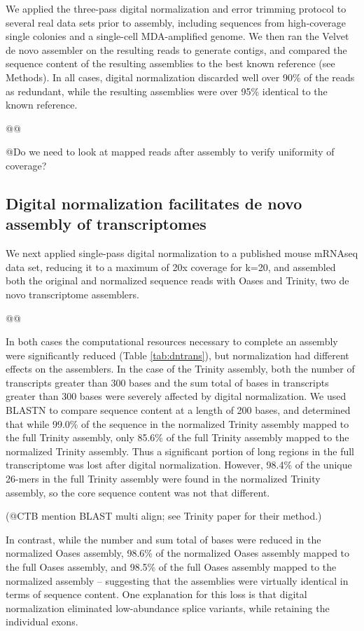 \documentclass[10pt]{article}
\begin{document}
We applied the three-pass digital normalization and error trimming
protocol to several real data sets prior to assembly, including
sequences from high-coverage single colonies and a single-cell
MDA-amplified genome.  We then ran the Velvet de novo assembler on the
resulting reads to generate contigs, and compared the sequence content
of the resulting assemblies to the best known reference (see Methods).
In all cases, digital normalization discarded well over 90\% of the
reads as redundant, while the resulting assemblies were over 95\%
identical to the known reference.

@@

@Do we need to look at mapped reads after assembly to verify uniformity
of coverage?

\subsection*{Digital normalization facilitates de novo assembly of transcriptomes}

We next applied single-pass digital normalization to a published mouse
mRNAseq data set, reducing it to a maximum of 20x coverage for k=20,
and assembled both the original and normalized sequence reads with
Oases and Trinity, two de novo transcriptome assemblers.

@@

In both cases the computational resources necessary to complete an
assembly were significantly reduced (Table \ref{tab:dntrans}), but
normalization had different effects on the assemblers.  In the case of
the Trinity assembly, both the number of transcripts greater than 300
bases and the sum total of bases in transcripts greater than 300 bases
were severely affected by digital normalization.  We used BLASTN to
compare sequence content at a length of 200 bases, and determined that
while 99.0\% of the sequence in the normalized Trinity assembly mapped
to the full Trinity assembly, only 85.6\% of the full Trinity assembly
mapped to the normalized Trinity assembly.  Thus a significant portion
of long regions in the full transcriptome was lost after digital
normalization.  However, 98.4\% of the unique 26-mers in the full
Trinity assembly were found in the normalized Trinity assembly, so the
core sequence content was not that different.

(@CTB mention BLAST multi align; see Trinity
paper for their method.)

In contrast, while the number and sum total of bases were reduced in
the normalized Oases assembly, 98.6\% of the normalized Oases
assembly mapped to the full Oases assembly, and 98.5\% of the full
Oases assembly mapped to the normalized assembly -- suggesting that
the assemblies were virtually identical in terms of sequence content.
One explanation for this loss is that digital normalization
eliminated low-abundance splice variants, while retaining the
individual exons.
\end{document}
